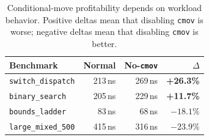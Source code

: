 \begin{table}[t]
  \centering
  \caption{Conditional-move profitability depends on workload behavior. Positive deltas mean that disabling \texttt{cmov} is worse; negative deltas mean that disabling \texttt{cmov} is better.}
  \label{tab:motivation_cmov}
  \small
  \begin{tabular}{lrrr}
    \toprule
    Benchmark & Normal & No-\texttt{cmov} & $\Delta$ \\
    \midrule
    \texttt{switch\_dispatch}  & 213\,ns & 269\,ns & \textbf{+26.3\%} \\
    \texttt{binary\_search}    & 205\,ns & 229\,ns & \textbf{+11.7\%} \\
    \texttt{bounds\_ladder}    & 83\,ns  & 68\,ns  & $-18.1\%$ \\
    \texttt{large\_mixed\_500} & 415\,ns & 316\,ns & $-23.9\%$ \\
    \bottomrule
  \end{tabular}
\end{table}